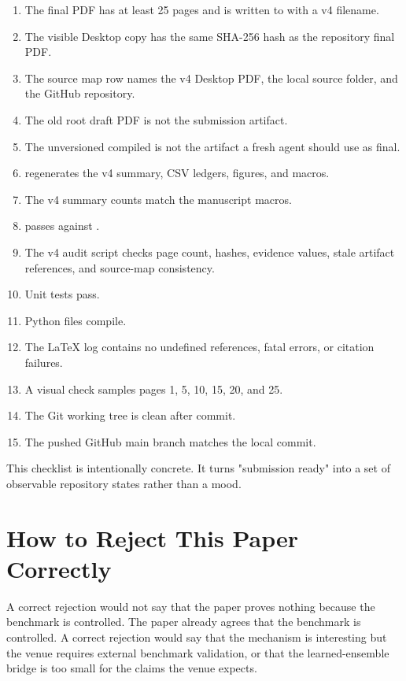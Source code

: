 \begin{enumerate}
\item The final PDF has at least 25 pages and is written to
 with a v4 filename.
\item The visible Desktop copy has the same SHA-256 hash as the repository
final PDF.
\item The source map row names the v4 Desktop PDF, the local source folder,
and the GitHub repository.
\item The old root draft PDF is not the submission artifact.
\item The unversioned compiled  is not
the artifact a fresh agent should use as final.
\item {} regenerates the v4 summary,
CSV ledgers, figures, and macros.
\item The v4 summary counts match the manuscript macros.
\item {} passes against
.
\item The v4 audit script checks page count, hashes, evidence values, stale
artifact references, and source-map consistency.
\item Unit tests pass.
\item Python files compile.
\item The LaTeX log contains no undefined references, fatal errors, or
citation failures.
\item A visual check samples pages 1, 5, 10, 15, 20, and 25.
\item The Git working tree is clean after commit.
\item The pushed GitHub main branch matches the local commit.
\end{enumerate}

This checklist is intentionally concrete. It turns "submission ready" into a
set of observable repository states rather than a mood.

\section{How to Reject This Paper Correctly}
\label{app:reject-correctly}

A correct rejection would not say that the paper proves nothing because the
benchmark is controlled. The paper already agrees that the benchmark is
controlled. A correct rejection would say that the mechanism is interesting
but the venue requires external benchmark validation, or that the
learned-ensemble bridge is too small for the claims the venue expects.

